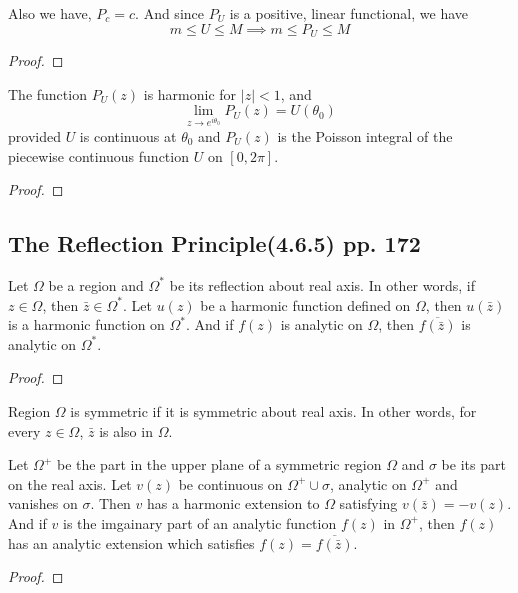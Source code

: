 \begin{remark}
	Also we have, $P_c = c$. And since $P_U$ is a positive, linear functional, we have
	\[m \le U \le M \implies m \le P_U \le M\]
\end{remark}
\begin{proof}
\end{proof}

\begin{theorem}[Schwarz]
	The function $P_U(z)$ is harmonic for $|z|<1$, and
	\begin{equation}
		\lim_{z \to e^{i\theta_0}} P_U(z) = U(\theta_0)
	\end{equation}
	provided $U$ is continuous at $\theta_0$ and $P_U(z)$ is the Poisson integral of the piecewise continuous function $U$ on $[0,2\pi]$.
\end{theorem}
\begin{proof}
\end{proof}

\subsection{The Reflection Principle(4.6.5) pp. 172}
\begin{remark}
	Let $\Omega$ be a region and $\Omega^\ast$ be its reflection about real axis.
	In other words, if $z \in \Omega$, then $\bar{z} \in \Omega^\ast$.
	Let $u(z)$ be a harmonic function defined on $\Omega$, then $u(\bar{z})$ is a harmonic function on $\Omega^\ast$.
	And if $f(z)$ is analytic on $\Omega$, then $\overline{f(\bar{z})}$ is analytic on $\Omega^\ast$.
\end{remark}
\begin{proof}
\end{proof}

\begin{definition}
	Region $\Omega$ is symmetric if it is symmetric about real axis.
	In other words, for every $z \in \Omega$, $\bar{z}$ is also in $\Omega$.
\end{definition}

\begin{theorem}
	Let $\Omega^+$ be the part in the upper plane of a symmetric region $\Omega$ and $\sigma$ be its part on the real axis.
	Let $v(z)$ be continuous on $\Omega^+ \cup \sigma$, analytic on $\Omega^+$ and vanishes on $\sigma$.
	Then $v$ has a harmonic extension to $\Omega$ satisfying $v(\bar{z}) = -v(z)$.
	And if $v$ is the imgainary part of an analytic function $f(z)$ in $\Omega^+$, then $f(z)$ has an analytic extension which satisfies $f(z) = \overline{f(\bar{z})}$.
\end{theorem}
\begin{proof}
\end{proof}

